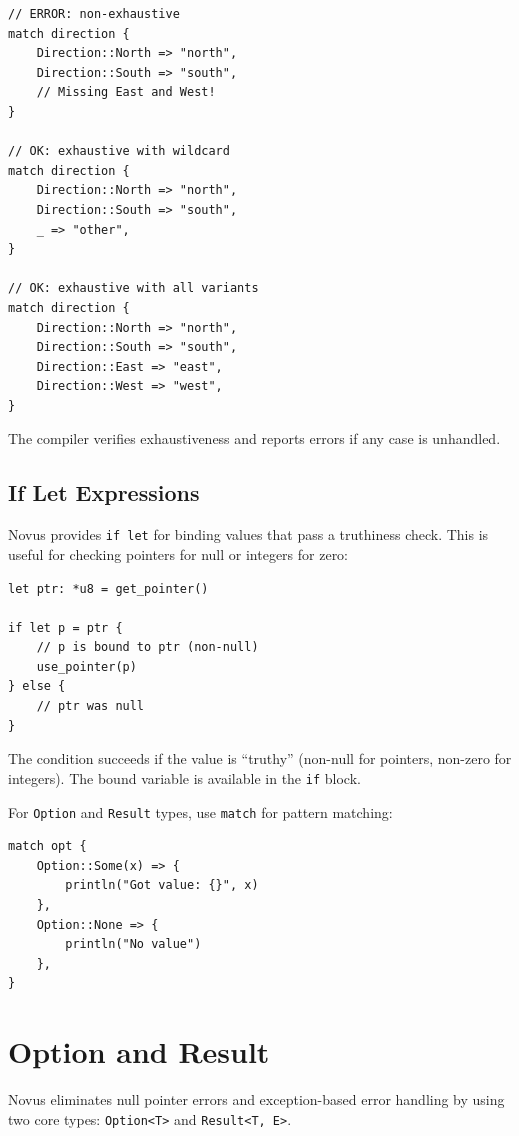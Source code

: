 \begin{lstlisting}
// ERROR: non-exhaustive
match direction {
    Direction::North => "north",
    Direction::South => "south",
    // Missing East and West!
}

// OK: exhaustive with wildcard
match direction {
    Direction::North => "north",
    Direction::South => "south",
    _ => "other",
}

// OK: exhaustive with all variants
match direction {
    Direction::North => "north",
    Direction::South => "south",
    Direction::East => "east",
    Direction::West => "west",
}
\end{lstlisting}

The compiler verifies exhaustiveness and reports errors if any case is unhandled.

\subsection{If Let Expressions}

Novus provides \texttt{if let} for binding values that pass a truthiness check. This is useful for checking pointers for null or integers for zero:

\begin{lstlisting}
let ptr: *u8 = get_pointer()

if let p = ptr {
    // p is bound to ptr (non-null)
    use_pointer(p)
} else {
    // ptr was null
}
\end{lstlisting}

The condition succeeds if the value is ``truthy'' (non-null for pointers, non-zero for integers). The bound variable is available in the \texttt{if} block.

For \texttt{Option} and \texttt{Result} types, use \texttt{match} for pattern matching:

\begin{lstlisting}
match opt {
    Option::Some(x) => {
        println("Got value: {}", x)
    },
    Option::None => {
        println("No value")
    },
}
\end{lstlisting}

\section{Option and Result}

Novus eliminates null pointer errors and exception-based error handling by using two core types: \texttt{Option<T>} and \texttt{Result<T, E>}.

